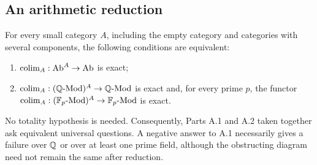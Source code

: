 \subsection{An arithmetic reduction}
\begin{proposition}\label{A:fieldwise}
For every small category $A$, including the empty category and categories
with several components, the following conditions are equivalent:
\begin{enumerate}
\item $\operatorname*{colim}_A:\mathrm{Ab}^A\to\mathrm{Ab}$ is exact;
\item $\operatorname*{colim}_A:(\mathbb Q\text{-}\mathrm{Mod})^A\to\mathbb Q\text{-}\mathrm{Mod}$
is exact and, for every prime $p$, the functor
$\operatorname*{colim}_A:(\mathbb F_p\text{-}\mathrm{Mod})^A\to\mathbb F_p\text{-}\mathrm{Mod}$
is exact.
\end{enumerate}
No totality hypothesis is needed. Consequently, Parts A.1 and A.2 taken
together ask equivalent universal questions. A negative answer to A.1
necessarily gives a failure over $\mathbb Q$ or over at least one prime field,
although the obstructing diagram need not remain the same after reduction.
\end{proposition}
